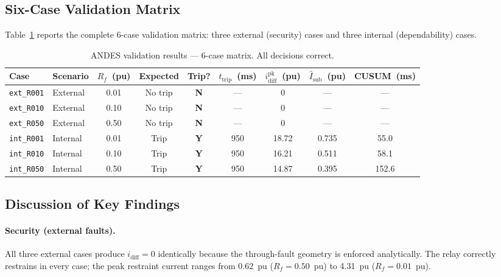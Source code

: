 \documentclass[11pt,a4paper]{article}
\begin{document}
\subsection{Six-Case Validation Matrix}

Table~\ref{tab:andes_results} reports the complete 6-case validation matrix:
three external (security) cases and three internal (dependability) cases.

\begin{table}[ht]
  \centering
  \caption{ANDES validation results — 6-case matrix. All decisions correct.}
  \label{tab:andes_results}
  \begin{tabular}{llccccccc}
    \toprule
    Case & Scenario & $R_f$~(pu) & Expected & Trip? & $t_\text{trip}$~(ms)
         & $i_\text{diff}^\text{pk}$~(pu) & $\hat{I}_\text{sub}$~(pu) & CUSUM~(ms) \\
    \midrule
    \texttt{ext\_R001} & External & 0.01 & No trip & \textbf{N} & --- & 0    & ---   & --- \\
    \texttt{ext\_R010} & External & 0.10 & No trip & \textbf{N} & --- & 0    & ---   & --- \\
    \texttt{ext\_R050} & External & 0.50 & No trip & \textbf{N} & --- & 0    & ---   & --- \\
    \texttt{int\_R001} & Internal & 0.01 & Trip    & \textbf{Y} & 950 & 18.72 & 0.735 & 55.0 \\
    \texttt{int\_R010} & Internal & 0.10 & Trip    & \textbf{Y} & 950 & 16.21 & 0.511 & 58.1 \\
    \texttt{int\_R050} & Internal & 0.50 & Trip    & \textbf{Y} & 950 & 14.87 & 0.395 & 152.6 \\
    \bottomrule
  \end{tabular}
\end{table}

\subsection{Discussion of Key Findings}

\paragraph{Security (external faults).}
All three external cases produce $i_\text{diff} = 0$ identically because
the through-fault geometry is enforced analytically.  The relay correctly
restrains in every case; the peak restraint current ranges from
0.62~pu ($R_f = 0.50$~pu) to 4.31~pu ($R_f = 0.01$~pu).
\end{document}
